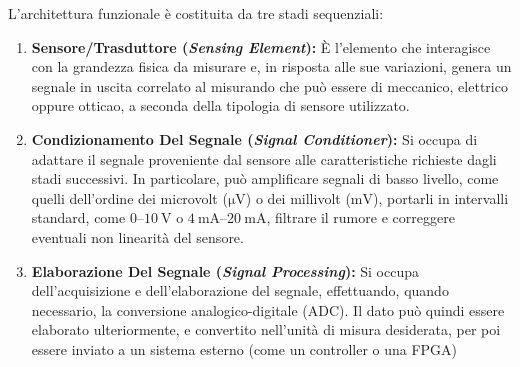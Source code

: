 ﻿\documentclass[11pt, a4paper]{article}
\begin{document}
\begin{center}
\end{center}

L'architettura funzionale è costituita da tre stadi sequenziali:

\begin{enumerate}
    \item \textbf{Sensore/Trasduttore (\textit{Sensing Element}):}
    È l'elemento che interagisce con la grandezza fisica da misurare e, in risposta alle sue variazioni, genera un segnale in uscita correlato al misurando che può essere di meccanico, elettrico oppure otticao, a seconda della tipologia di sensore utilizzato.

    \item \textbf{Condizionamento Del Segnale (\textit{Signal Conditioner}):}
    Si occupa di adattare il segnale proveniente dal sensore alle caratteristiche richieste dagli stadi successivi. In particolare, può amplificare segnali di basso livello, come quelli dell'ordine dei microvolt ($\si{\micro\volt}$) o dei millivolt ($\si{\milli\volt}$), portarli in intervalli standard, come $0$--$\SI{10}{\volt}$ o $\SI{4}{\milli\ampere}$--$\SI{20}{\milli\ampere}$, filtrare il rumore e correggere eventuali non linearità del sensore.

    \item \textbf{Elaborazione Del Segnale (\textit{Signal Processing}):}
    Si occupa dell'acquisizione e dell'elaborazione del segnale, effettuando, quando necessario, la conversione analogico-digitale (ADC). Il dato può quindi essere elaborato ulteriormente, e convertito nell'unità di misura desiderata, per poi essere inviato a un sistema esterno (come un controller o una FPGA)
\end{enumerate}
\end{document}
